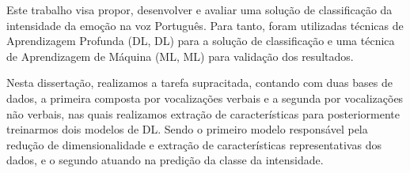 
Este trabalho visa propor, desenvolver e avaliar uma solução de classificação da intensidade da emoção na voz Português. Para tanto, foram utilizadas técnicas de Aprendizagem Profunda (\acrlong{DL}, \acrshort{DL}) para a solução de classificação e uma técnica de Aprendizagem de Máquina (\acrlong{ML}, \acrshort{ML}) para validação dos resultados.

Nesta dissertação, realizamos a tarefa supracitada, contando com duas bases de dados, a primeira composta por vocalizações verbais e a segunda por vocalizações não verbais, nas quais realizamos extração de características para posteriormente treinarmos dois modelos de \acrshort{DL}. Sendo o primeiro modelo responsável pela redução de dimensionalidade e extração de características representativas dos dados, e o segundo atuando na predição da classe da intensidade.





